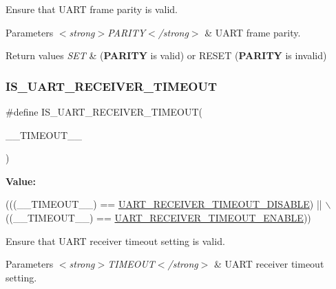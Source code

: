Ensure that U\+A\+RT frame parity is valid. 


\begin{DoxyParams}{Parameters}
{\em $<$strong$>$\+P\+A\+R\+I\+T\+Y$<$/strong$>$} & U\+A\+RT frame parity. \\
\hline
\end{DoxyParams}

\begin{DoxyRetVals}{Return values}
{\em S\+ET} & ({\bfseries P\+A\+R\+I\+TY} is valid) or R\+E\+S\+ET ({\bfseries P\+A\+R\+I\+TY} is invalid) \\
\hline
\end{DoxyRetVals}
\mbox{\label{group___u_a_r_t___private___macros_gaa2ad21da17caf46375c7bd4efbde8b17}} 
\subsubsection{\texorpdfstring{I\+S\+\_\+\+U\+A\+R\+T\+\_\+\+R\+E\+C\+E\+I\+V\+E\+R\+\_\+\+T\+I\+M\+E\+O\+UT}{IS\_UART\_RECEIVER\_TIMEOUT}}
{\footnotesize\ttfamily \#define I\+S\+\_\+\+U\+A\+R\+T\+\_\+\+R\+E\+C\+E\+I\+V\+E\+R\+\_\+\+T\+I\+M\+E\+O\+UT(\begin{DoxyParamCaption}\item[{}]{\+\_\+\+\_\+\+T\+I\+M\+E\+O\+U\+T\+\_\+\+\_\+ }\end{DoxyParamCaption})}

{\bfseries Value\+:}
\begin{DoxyCode}
(((\_\_TIMEOUT\_\_) == \hyperlink{group___u_a_r_t___receiver___time_out_ga575c43813df656b21dc39aff6a968046}{UART\_RECEIVER\_TIMEOUT\_DISABLE}) || \(\backslash\)
                                               ((\_\_TIMEOUT\_\_) == 
      \hyperlink{group___u_a_r_t___receiver___time_out_ga6e25985f0dacc3e79ae552746952ac18}{UART\_RECEIVER\_TIMEOUT\_ENABLE}))
\end{DoxyCode}


Ensure that U\+A\+RT receiver timeout setting is valid. 


\begin{DoxyParams}{Parameters}
{\em $<$strong$>$\+T\+I\+M\+E\+O\+U\+T$<$/strong$>$} & U\+A\+RT receiver timeout setting. \\
\hline
\end{DoxyParams}

